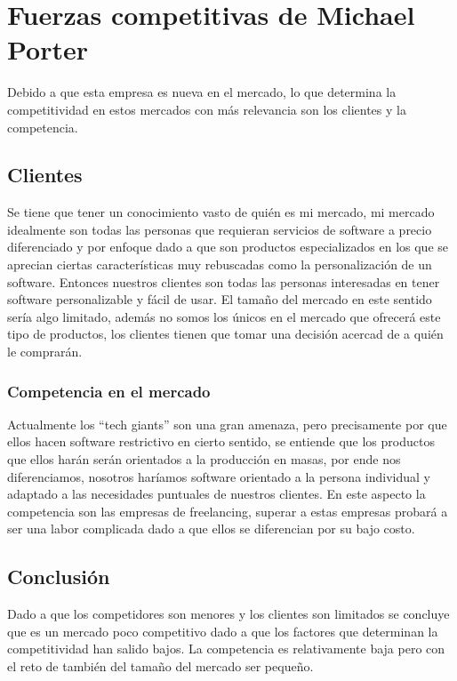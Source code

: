 \documentclass{article}
\begin{document}
\section{Fuerzas competitivas de Michael Porter}
Debido a que esta empresa es nueva en el mercado, lo que determina la competitividad en estos mercados con más relevancia son los clientes y la competencia.

\subsection{Clientes}
Se tiene que tener un conocimiento vasto de quién es mi mercado, mi mercado idealmente son todas las personas que requieran servicios de software a precio diferenciado y por enfoque dado a que son productos especializados en los que se aprecian ciertas características muy rebuscadas como la personalización de un software. Entonces nuestros clientes son todas las personas interesadas en tener software personalizable y fácil de usar. El tamaño del mercado en este sentido sería algo limitado, además no somos los únicos en el mercado que ofrecerá este tipo de productos, los clientes tienen que tomar una decisión acercad de a quién le comprarán.


\subsubsection{Competencia en el mercado}
Actualmente los ``tech giants'' son una gran amenaza, pero precisamente por que ellos hacen software restrictivo en cierto sentido, se entiende que los productos que ellos harán serán orientados a la producción en masas, por ende nos diferenciamos, nosotros haríamos software orientado a la persona individual y adaptado a las necesidades puntuales de nuestros clientes. En este aspecto la competencia son las empresas de freelancing, superar a estas empresas probará a ser una labor complicada dado a que ellos se diferencian por su bajo costo. 


\subsection{Conclusión}
Dado a que los competidores son menores y los clientes son limitados se concluye que es un mercado poco competitivo dado a que los factores que determinan la competitividad han salido bajos. La competencia es relativamente baja pero con el reto de también del tamaño del mercado ser pequeño.
\end{document}
